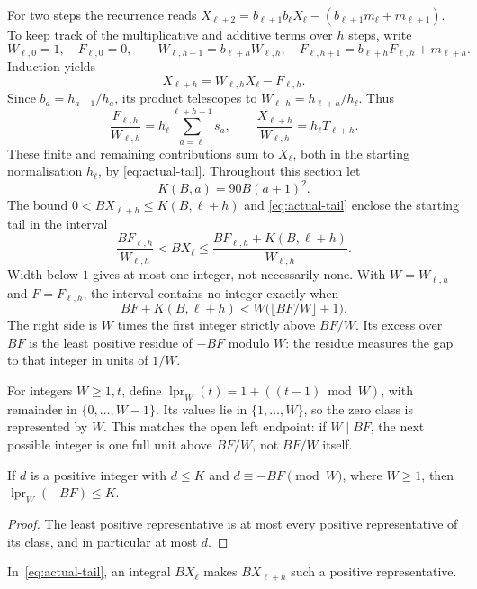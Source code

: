 \documentclass[11pt]{article}
\begin{document}
For two steps the recurrence reads
$X_{\ell+2}=b_{\ell+1}b_\ell X_\ell-(b_{\ell+1}m_\ell+m_{\ell+1})$.
To keep track of the multiplicative and additive terms over $h$ steps,
write
\[
 W_{\ell,0}=1,\quad F_{\ell,0}=0,\qquad
 W_{\ell,h+1}=b_{\ell+h}W_{\ell,h},\quad
 F_{\ell,h+1}=b_{\ell+h}F_{\ell,h}+m_{\ell+h}.
\]
Induction yields
\begin{equation}\label{eq:actual-tail}
 X_{\ell+h}=W_{\ell,h}X_\ell-F_{\ell,h}.
\end{equation}
Since $b_a=h_{a+1}/h_a$, its product telescopes to
$W_{\ell,h}=h_{\ell+h}/h_\ell$. Thus
\[
 \frac{F_{\ell,h}}{W_{\ell,h}}
 =h_\ell\sum_{a=\ell}^{\ell+h-1}s_a,
 \qquad
 \frac{X_{\ell+h}}{W_{\ell,h}}=h_\ell T_{\ell+h}.
\]
These finite and remaining contributions sum to $X_\ell$, both in the
starting normalisation $h_\ell$, by \eqref{eq:actual-tail}.
Throughout this section let
\begin{equation}\label{eq:actual-bound}
 K(B,a)=90B(a+1)^2.
\end{equation}
The bound $0<BX_{\ell+h}\le K(B,\ell+h)$ and
\eqref{eq:actual-tail} enclose the starting tail in the interval
\[
 \frac{BF_{\ell,h}}{W_{\ell,h}}<BX_\ell
 \le\frac{BF_{\ell,h}+K(B,\ell+h)}{W_{\ell,h}}.
\]
Width below $1$ gives at most one integer, not necessarily none. With
$W=W_{\ell,h}$ and $F=F_{\ell,h}$, the interval contains no integer exactly
when
\[
 BF+K(B,\ell+h)<W\bigl(\lfloor BF/W\rfloor+1\bigr).
\]
The right side is $W$ times the first integer strictly above $BF/W$.
Its excess over $BF$ is the least positive residue of $-BF$ modulo $W$:
the residue measures the gap to that integer in units of $1/W$.

For integers $W\ge1,t$, define
$\operatorname{lpr}_W(t)=1+((t-1)\bmod W)$, with remainder in
$\{0,\ldots,W-1\}$. Its values lie in $\{1,\ldots,W\}$, so the zero class
is represented by $W$. This matches the open left endpoint: if $W\mid BF$,
the next possible integer is one full unit above $BF/W$, not $BF/W$ itself.

\begin{lemma}\label{res:consumer}
If $d$ is a positive integer with $d\le K$ and $d\equiv -BF\pmod W$,
where $W\ge1$, then $\operatorname{lpr}_W(-BF)\le K$.
\end{lemma}
\begin{proof}
The least positive representative is at most every positive representative
of its class, and in particular at most $d$.
\end{proof}
In~\eqref{eq:actual-tail}, an integral $BX_\ell$ makes $BX_{\ell+h}$
such a positive representative.
\end{document}

